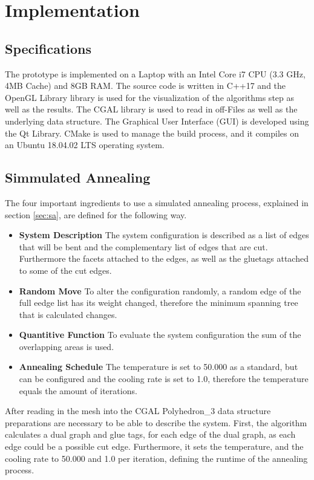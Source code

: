 \documentclass[draft,final]{vutinfth} %
\begin{document}
\chapter{Implementation}
\label{chap:Implementation}

\section{Specifications}

The prototype is implemented on a Laptop with an Intel Core i7 CPU (3.3 GHz, 4MB Cache) and 8GB RAM. The source code is written in C++17 and the OpenGL Library library is used for the visualization of the algorithms step as well as the results. The CGAL library is used to read in off-Files as well as the underlying data structure. The Graphical User Interface (GUI) is developed using the Qt Library. CMake is used to manage the build process, and it compiles on an Ubuntu 18.04.02 LTS operating system.

\section{Simmulated Annealing}

The four important ingredients to use a simulated annealing process, explained in section \ref{sec:sa}, are defined for the following way.
\begin{itemize}
	\item \textbf{System Description} The system configuration is described as a list of edges that will be bent and the complementary list of edges that are cut. Furthermore the facets attached to the edges, as well as the gluetags attached to some of the cut edges.
	\item \textbf{Random Move} To alter the configuration randomly, a random edge of the full eedge list has its weight changed, therefore the minimum spanning tree that is calculated changes.
	\item \textbf{Quantitive Function} To evaluate the system configuration the sum of the overlapping areas is used.
	\item \textbf{Annealing Schedule} The temperature is set to 50.000 as a standard, but can be configured and the cooling rate is set to 1.0, therefore the temperature equals the amount of iterations.
\end{itemize}

After reading in the mesh into the CGAL Polyhedron\_3 data structure preparations are necessary to be able to describe the system. First, the algorithm calculates a dual graph and glue tags, for each edge of the dual graph, as each edge could be a possible cut edge. Furthermore, it sets the temperature, and the cooling rate to 50.000 and 1.0 per iteration, defining the runtime of the annealing process.
\end{document}
